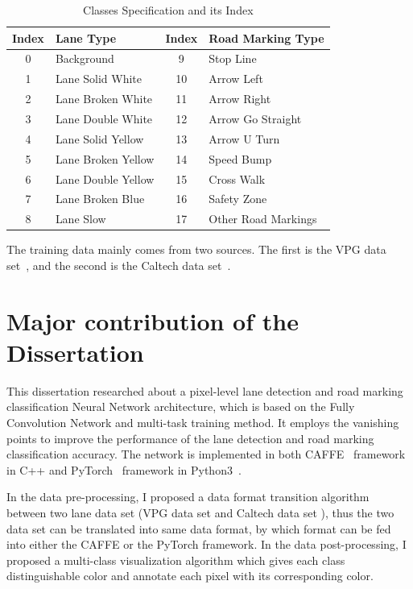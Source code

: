 \begin{spacing}{1.5}
\begin{table}[ht]
\centering
\caption{Classes Specification and its Index}
\label{tab:classes}
\begin{tabular}{clcl}
\hline
Index & Lane Type          & Index & Road Marking Type   \\ \hline
0     & Background         & 9     & Stop Line           \\
1     & Lane Solid White   & 10    & Arrow Left          \\
2     & Lane Broken White  & 11    & Arrow Right         \\
3     & Lane Double White  & 12    & Arrow Go Straight   \\
4     & Lane Solid Yellow  & 13    & Arrow U Turn        \\
5     & Lane Broken Yellow & 14    & Speed Bump          \\
6     & Lane Double Yellow & 15    & Cross Walk          \\
7     & Lane Broken Blue   & 16    & Safety Zone         \\
8     & Lane Slow          & 17    & Other Road Markings \\ \hline
\end{tabular}
\end{table}%

The training data mainly comes from two sources. The first is the VPG data set~\cite{lee2017vpgnet}, and the second is the Caltech data set~\cite{aly2008real}.

\section{Major contribution of the Dissertation}
\label{sec:IN_contribution}

This dissertation researched about a pixel-level lane detection and road marking classification Neural Network architecture, which is based on the Fully Convolution Network and multi-task training method. It employs the vanishing points to improve the performance of the lane detection and road marking classification accuracy. The network is implemented in both CAFFE~\cite{jia2014caffe} framework in C++ and PyTorch~\cite{NEURIPS2019_9015} framework in Python3~\cite{python3}.

In the data pre-processing, I proposed a data format transition algorithm between two lane data set (VPG data set \cite{lee2017vpgnet} and Caltech data set \cite{aly2008real}), thus the two data set can be translated into same data format, by which format can be fed into either the CAFFE or the PyTorch framework. In the data post-processing, I proposed a multi-class visualization algorithm which gives each class distinguishable color and annotate each pixel with its corresponding color.


\end{spacing}
